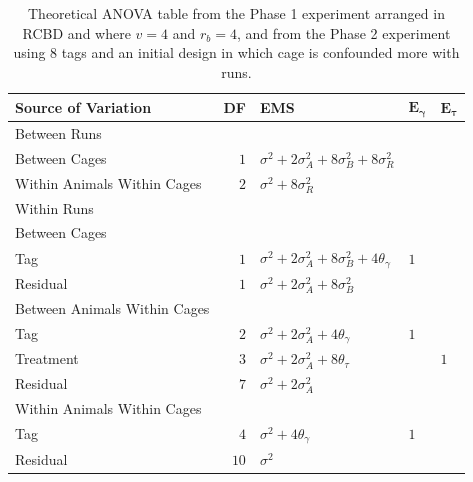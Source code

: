 \documentclass[12pt,a4paper]{article}
\begin{document}
\begin{table}[ht]
\centering
 \caption{Theoretical ANOVA table from the Phase 1 experiment arranged in RCBD and where $v = 4$ and $r_b = 4$, and from the Phase 2 experiment using 8 tags and an initial design in which cage is confounded more with runs.}
 \begin{tabular}[t]{lrlll} 
 \toprule 
 \multicolumn{1}{l}{\textbf{Source of Variation}} & \multicolumn{1}{l}{\textbf{DF}} & \multicolumn{1}{l}{\textbf{EMS}}& \multicolumn{1}{l}{$\bm{E_{\gamma}}$}&\multicolumn{1}{l}{$\bm{E_{\tau}}$}\\ 
 \midrule 
 Between Runs &  &  & & \\ 
 \quad Between Cages & $1$ & $\sigma^2+2\sigma_{A}^2+8\sigma_{B}^2+8\sigma_{R}^2$ & & \\  
 \quad Within Animals Within Cages & $2$ & $\sigma^2+8\sigma_{R}^2$ & & \\ \hline 
 Within Runs &  &  & & \\ 
 \quad Between Cages &  &  & & \\ 
 \quad \quad Tag & $1$ & $\sigma^2+2\sigma_{A}^2+8\sigma_{B}^2+4\theta_{\gamma}$ &$1$ & \\ 
 \quad \quad Residual & $1$ & $\sigma^2+2\sigma_{A}^2+8\sigma_{B}^2$ & & \\ \hline 
 \quad Between Animals Within Cages &  &  & & \\ 
 \quad \quad Tag & $2$ & $\sigma^2+2\sigma_{A}^2+4\theta_{\gamma}$ &$1$ & \\ 
 \quad \quad Treatment & $3$ & $\sigma^2+2\sigma_{A}^2+8\theta_{\tau}$ & & $1$\\ 
 \quad \quad Residual & $7$ & $\sigma^2+2\sigma_{A}^2$ & & \\ \hline 
 \quad Within Animals Within Cages &  &  & & \\ 
 \quad \quad Tag & $4$ & $\sigma^2+4\theta_{\gamma}$ &$1$ & \\ 
 \quad \quad Residual & $10$ & $\sigma^2$ & & \\ 
 \bottomrule 
 \end{tabular} 
 \label{tab:ANOVAPhase1RCBD3} 
\end{table} 
\end{document}
